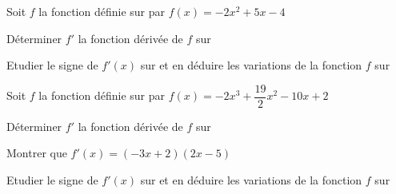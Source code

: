 \documentclass[12pt,a4paper]{book}
\begin{document}

Soit $f$ la fonction définie sur \R par $f(x)=-2x^2+5x-4$
\begin{enumMet}
	\item Déterminer $f'$ la fonction dérivée de $f$ sur \R
	\item Etudier le signe de $f'(x)$ sur \R et en déduire les variations de la fonction $f$ sur \R
\end{enumMet}


Soit $f$ la fonction définie sur \R par $f(x)=-2x^3+\dfrac{19}{2}x^2-10x+2$
\begin{enumMet}
	\item Déterminer $f'$ la fonction dérivée de $f$ sur \R
	\item Montrer que $f'(x)=(-3x+2)(2x-5)$
	\item Etudier le signe de $f'(x)$ sur \R et en déduire les variations de la fonction $f$ sur \R
\end{enumMet}
\end{document}
